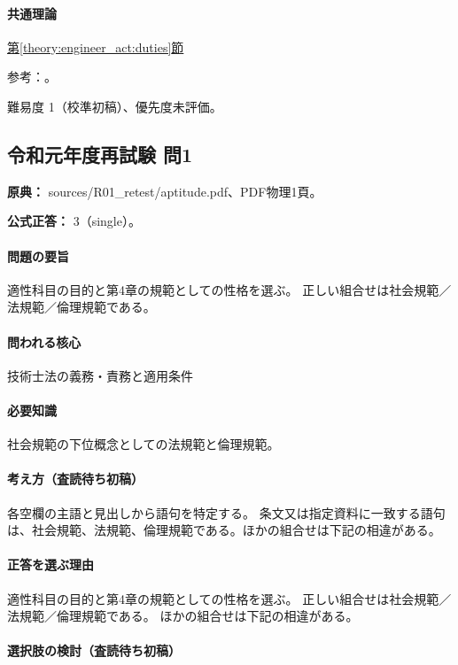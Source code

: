 \paragraph{共通理論} \hyperref[theory:engineer_act:duties]{第\ref*{theory:engineer_act:duties}節}

\par 参考：\cite{engineer_act_current}。

\par 難易度 1（校準初稿）、優先度未評価。

\subsection{令和元年度再試験 問1}
\label{q:r01-ret-apt-01}

\noindent\textbf{原典：} sources/R01\_retest/aptitude.pdf、PDF物理1頁。

\textbf{公式正答：} 3（single）。

\paragraph{問題の要旨} 適性科目の目的と第4章の規範としての性格を選ぶ。 正しい組合せは社会規範／法規範／倫理規範である。

\paragraph{問われる核心} 技術士法の義務・責務と適用条件

\paragraph{必要知識} 社会規範の下位概念としての法規範と倫理規範。

\paragraph{考え方（査読待ち初稿）} 各空欄の主語と見出しから語句を特定する。 条文又は指定資料に一致する語句は、社会規範、法規範、倫理規範である。ほかの組合せは下記の相違がある。

\paragraph{正答を選ぶ理由} 適性科目の目的と第4章の規範としての性格を選ぶ。 正しい組合せは社会規範／法規範／倫理規範である。 ほかの組合せは下記の相違がある。

\paragraph{選択肢の検討（査読待ち初稿）}\mbox{}\par

